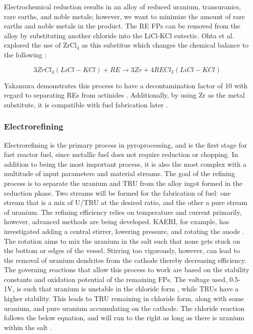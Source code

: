 Electrochemical reduction results in an alloy of reduced uranium, transuranics, rare earths, and noble metals; however, we want to minimize the amount of rare earths and noble metals in the product.
The RE FPs can be removed from the alloy by substituting another chloride into the LiCl-KCl eutectic.
Ohta et al. explored the use of ZrCl$_4$ as this substitue which changes the chemical balance to the following \cite{ohta}:

\[ 3ZrCl_4(LiCl-KCl) + RE \rightarrow 3Zr + 4RECl_3(LiCl-KCl) \]

Yakamura demonstrates this process to have a decontamination factor of 10 with regard to separating REs from actinides \cite{sakamura}. Additionally, by using Zr as the metal substitute, it is compatible with fuel fabrication later \cite{ohta}.
\subsubsection{Electrorefining}
Electrorefining is the primary process in pyroprocessing, and is the first stage for fast reactor fuel, since metallic fuel does not require reduction or chopping.
In addition to being the most important process, it is also the most complex with a multitude of input parameters and material streams. 
The goal of the refining process is to separate the uranium and TRU from the alloy ingot formed in the reduction phase.
Two streams will be formed for the fabrication of fuel: one stream that is a mix of U/TRU at the desired ratio, and the other a pure stream of uranium.
The refining efficiency relies on temperature and current primarily, however, advanced methods are being developed.
KAERI, for example, has investigated adding a central stirrer, lowering pressure, and rotating the anode \cite{lee_advanced}.
The rotation aims to mix the uranium in the salt such that none gets stuck on the bottom or edges of the vessel. 
Stirring too vigorously, however, can lead to the removal of uranium dendrites from the cathode thereby decreasing efficiency.\\

The governing reactions that allow this process to work are based on the stability constants and oxidation potential of the remaining FPs.
The voltage used,  0.5-1V, is such that uranium is unstable in the chloride form \cite{organisation}, while TRUs have a higher stability. 
This leads to TRU remaining in chloride form, along with some uranium, and pure uranium accumulating on the cathode.
The chloride reaction follows the below equation, and will run to the right as long as there is uranium within the salt \cite{organisation}.

